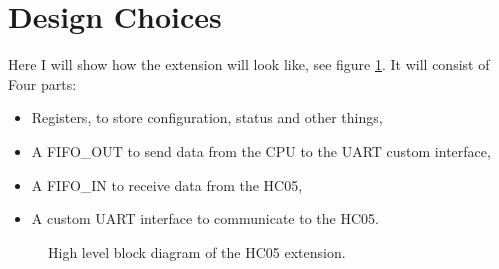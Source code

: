 \documentclass[11pt]{article}
\begin{document}
\section{Design Choices}
Here I will show how the extension will look like, see figure \ref{high_level}. It will consist of Four parts:
\begin{itemize}
    \item Registers, to store configuration, status and other things,
    \item A FIFO\_OUT to send data from the CPU to the UART custom interface,
    \item A FIFO\_IN to receive data from the HC05,
    \item A custom UART interface to communicate to the HC05.
\end{itemize}
\begin{figure}[H]
        \caption{High level block diagram of the HC05 extension.}
        \label{high_level}
\end{figure}
\end{document}
